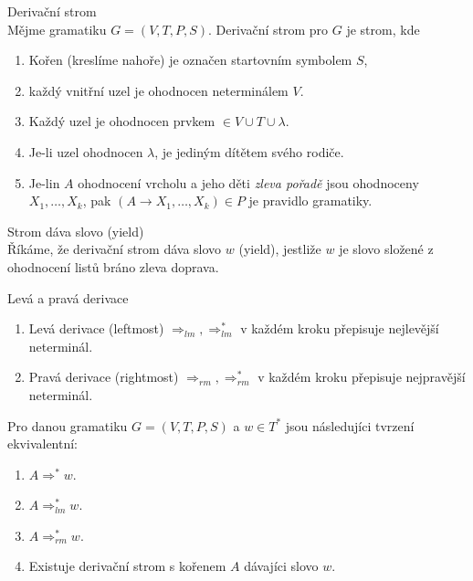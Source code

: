 \documentclass[../main.tex]{subfiles}
\begin{document}
\begin{definition}
    Derivační strom\\

    Mějme gramatiku $G = (V,T,P,S)$. Derivační strom pro $G$ je strom, kde 
    \begin{enumerate}
        \item Kořen (kreslíme nahoře) je označen startovním symbolem $S$,
        \item každý vnitřní uzel je ohodnocen neterminálem $V$.
        \item Každý uzel je ohodnocen prvkem $\in V \cup T \cup {\lambda}$.
        \item Je-li uzel ohodnocen $\lambda$, je jediným dítětem svého rodiče.
        \item Je-lin $A$ ohodnocení vrcholu a jeho děti \textit{zleva pořadě} jsou ohodnoceny 
        $X_1,\dots, X_k$, pak $(A \rightarrow X_1, \dots, X_k)\in P$ je pravidlo gramatiky.
    \end{enumerate}
\end{definition}

\begin{definition}
    Strom dáva slovo (yield)\\

    Říkáme, že derivační strom dáva slovo $w$ (yield), jestliže $w$ je slovo složené z ohodnocení listů bráno zleva doprava.
\end{definition}

\begin{definition}
    Levá a pravá derivace\\

    \begin{enumerate}
        \item Levá derivace (leftmost) $\Rightarrow_{lm}, \Rightarrow_{lm}^*$ v každém kroku přepisuje nejlevější neterminál.
        \item Pravá derivace (rightmost) $\Rightarrow_{rm}, \Rightarrow_{rm}^*$ v každém kroku přepisuje nejpravější neterminál.
    \end{enumerate}
\end{definition}

\begin{theorem}
    Pro danou gramatiku $G = (V,T,P,S)$ a $w\in T^*$ jsou následujíci tvrzení ekvivalentní:
    \begin{enumerate}
        \item $A \Rightarrow^* w$.
        \item $A \Rightarrow^*_{lm} w$.
        \item $A \Rightarrow^*_{rm} w$.
        \item Existuje derivační strom s kořenem $A$ dávajíci slovo $w$.
    \end{enumerate}
\end{theorem}
\end{document}
